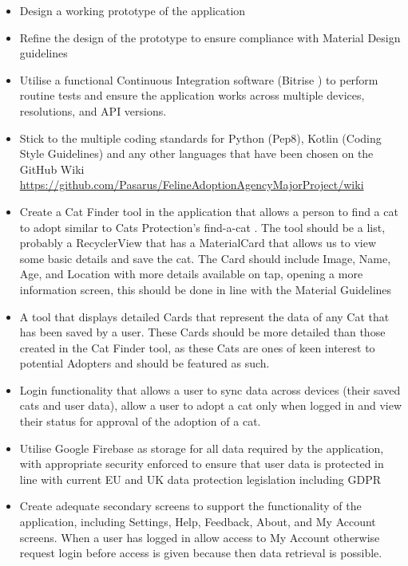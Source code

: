     \begin{itemize}
        \item Design a working prototype of the application
        \item Refine the design of the prototype to ensure compliance with Material Design guidelines \cite{MATERIALDESIGNGUIDELINES}
        \item Utilise a functional Continuous Integration software (Bitrise \cite{BITRISE}) to perform routine tests and ensure the application works across multiple devices, resolutions, and API versions.
        \item Stick to the multiple coding standards for Python (Pep8), Kotlin (Coding Style Guidelines) and any other languages that have been chosen on the GitHub Wiki \url{https://github.com/Pasarus/FelineAdoptionAgencyMajorProject/wiki}
        \item Create a Cat Finder tool in the application that allows a person to find a cat to adopt similar to Cats Protection's find-a-cat \cite{CATSPROTECTION}. The tool should be a list, probably a RecyclerView that has a Material\gls{Card} that allows us to view some basic details and save the cat. The Card should include Image, Name, Age, and Location with more details available on tap, opening a more information screen, this should be done in line with the Material Guidelines \cite{MATERIALDESIGNGUIDELINES}
        \item A tool that displays detailed \gls{Card}s that represent the data of any Cat that has been saved by a user. These \gls{Card}s should be more detailed than those created in the Cat Finder tool, as these Cats are ones of keen interest to potential Adopters and should be featured as such.
        \item Login functionality that allows a user to sync data across devices (their saved cats and user data), allow a user to adopt a cat only when logged in and view their status for approval of the adoption of a cat.
        \item Utilise Google Firebase as storage for all data required by the application, with appropriate security enforced to ensure that user data is protected in line with current EU and UK data protection legislation including GDPR \cite{GDPRARTICLE1}
        \item Create adequate secondary screens to support the functionality of the application, including Settings, Help, Feedback, About, and My Account screens. When a user has logged in allow access to My Account otherwise request login before access is given because then data retrieval is possible.

\end{itemize}
